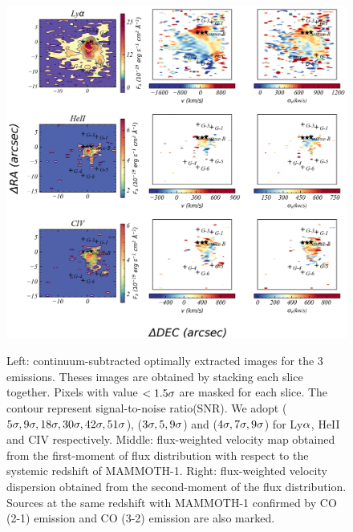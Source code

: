 \documentclass[../Results.tex]{subfiles}
\begin{document}
	 \begin{figure}[htp]
		\centering
		\includegraphics[width=\textwidth]{figs/emissionmap}
		\label{kinematicsmap}
		\caption{Left: continuum-subtracted optimally extracted images for the 3 emissions. Theses images are obtained by stacking each slice together. Pixels with value $\rm < 1.5\sigma$ are masked for each slice. The contour represent signal-to-noise ratio(SNR). We adopt ($\rm 5\sigma,9\sigma,18\sigma,30\sigma,42\sigma,51\sigma$), ($\rm 3\sigma,5,9\sigma$) and ($\rm 4\sigma,7\sigma,9\sigma$) for Ly$\rm \alpha$, HeII and CIV respectively. Middle: flux-weighted velocity map obtained from the first-moment of flux distribution with respect to the systemic redshift of MAMMOTH-1. Right: flux-weighted velocity dispersion obtained from the second-moment of the flux distribution. Sources at the same redshift with MAMMOTH-1 confirmed by CO (2-1) emission \citep{emonts2019cold} and CO (3-2) emission \citep{qiongli2020} are also marked. }
	\end{figure}
	
\end{document}
